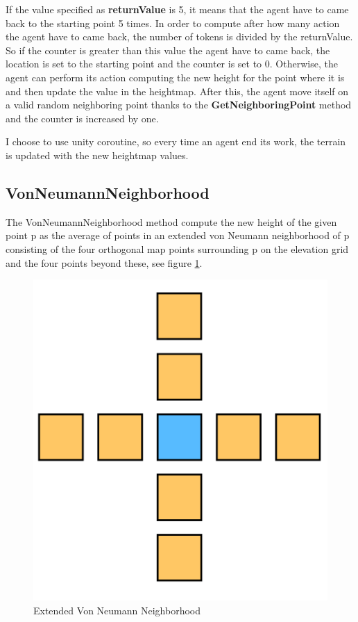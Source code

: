 \documentclass[12pt]{article}
\begin{document}
    If the value specified as \textbf{returnValue} is 5, it means that the agent have to came back to the starting point 5 times. In order to compute after how many action the agent
    have to came back, the number of tokens is divided by the returnValue. So if the counter is greater than this value the agent have to came back, the location is set to the
    starting point and the counter is set to 0. Otherwise, the agent can perform its action computing the new height for the point where it is and then update the value in the heightmap.
    After this, the agent move itself on a valid random neighboring point thanks to the \textbf{GetNeighboringPoint} method and the counter is increased by one.

    I choose to use unity coroutine, so every time an agent end its work, the terrain is updated with the new heightmap values.

    \subsection{VonNeumannNeighborhood} \label{section:Von Neumann}
    The VonNeumannNeighborhood method compute the new height of the given point p as the average of points in an extended von Neumann neighborhood of p consisting of the
    four orthogonal map points surrounding p on the elevation grid and the four points beyond these, see figure \ref{fig:vonNeumann}.

    \begin{figure}
        \centering
        \includegraphics[scale = 0.7]{images/Extended VonNeumannNeighborhood.png}
        \caption{Extended Von Neumann Neighborhood}
        \label{fig:vonNeumann}
    \end{figure}
\end{document}
